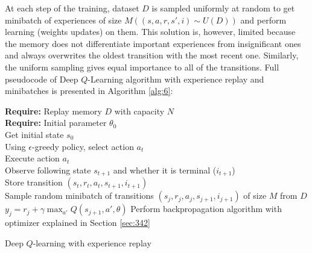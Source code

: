         \par
        At each step of the training, dataset $D$ is sampled uniformly at random to get minibatch of experiences of size $M (( s, a, r, s' , i) \sim U (D))$ and perform learning (weights updates) on them. This solution is, however, limited because the memory does not differentiate important experiences from insignificant ones and always overwrites the oldest transition with the most recent one. Similarly, the uniform sampling gives equal importance to all of the transitions. Full pseudocode of Deep $Q$-Learning algorithm with experience replay and minibatches is presented in Algorithm \ref{alg:6}:
 \vspace{5mm}
        \par
            \begin{algorithm}[H]\label{alg:6}
            
            \textbf{Require:} Replay memory $D$ with capacity $N$ \\
            \textbf{Require:} Initial parameter $\theta_0$ \\
                {
                Get initial state $s_0$ \\
               
                    {
                       Using $\epsilon$-greedy policy, select action $a_t$\\
                       Execute action $a_t$\\
                       Observe following state $s_{t+1}$ and whether it is terminal ($i_{t+1}$)\\
                       Store transition $(s_t,r_t,a_t,s_{t+1},i_{t+1})$\\
                       Sample random minibatch of transitions $(s_j,r_j,a_j,s_{j+1},i_{j+1})$   of size $M$ from $D$\\
                            {
                                {$y_j=r_j+\gamma \max_{a'}Q(s_{j+1},a',\theta)$}
                            }
                    }
                    Perform backpropagation algorithm with optimizer explained in Section \ref{sec:342} \\
                }

            \caption{Deep $Q$-learning with experience replay}
            \end{algorithm}
            
